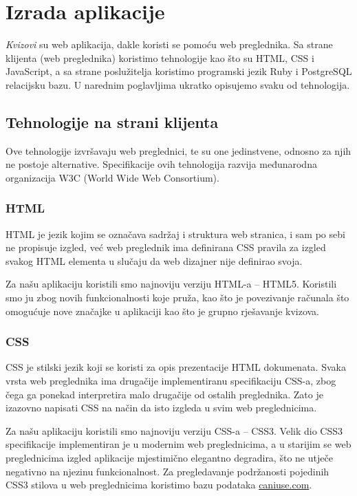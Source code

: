 \documentclass{scrreprt}
\begin{document}
\section{Izrada aplikacije}

\emph{Kvizovi} su web aplikacija, dakle koristi se pomoću web preglednika. Sa
strane klijenta (web preglednika) koristimo tehnologije kao što su HTML, CSS i
JavaScript, a sa strane poslužitelja koristimo programski jezik Ruby i
PostgreSQL relacijsku bazu. U narednim poglavljima ukratko opisujemo svaku od
tehnologija.

\subsection{Tehnologije na strani klijenta}

Ove tehnologije izvršavaju web preglednici, te su one jedinstvene, odnosno za
njih ne postoje alternative. Specifikacije ovih tehnologija razvija međunarodna
organizacija W3C (World Wide Web Consortium).

\subsubsection{HTML}

HTML je jezik kojim se označava sadržaj i struktura web stranica, i sam po sebi
ne propisuje izgled, već web preglednik ima definirana CSS pravila za izgled
svakog HTML elementa u slučaju da web dizajner nije definirao svoja.\cite{html}

Za našu aplikaciju koristili smo najnoviju verziju HTML-a -- HTML5. Koristili
smo ju zbog novih funkcionalnosti koje pruža, kao što je povezivanje računala
što omogućuje nove značajke u aplikaciji kao što je grupno rješavanje kvizova.

\subsubsection{CSS}

CSS je stilski jezik koji se koristi za opis prezentacije HTML dokumenata. Svaka
vrsta web preglednika ima drugačije implementiranu specifikaciju CSS-a, zbog
čega ga ponekad interpretira malo drugačije od ostalih preglednika. Zato je
izazovno napisati CSS na način da isto izgleda u svim web
preglednicima.\cite{css}

Za našu aplikaciju koristili smo najnoviju verziju CSS-a -- CSS3. Velik dio CSS3
specifikacije implementiran je u modernim web preglednicima, a u starijim se web
preglednicima izgled aplikacije mjestimično elegantno degradira, što ne utječe
negativno na njezinu funkcionalnost. Za pregledavanje podržanosti pojedinih CSS3
stilova u web preglednicima koristimo bazu podataka \url{caniuse.com}.
\end{document}
